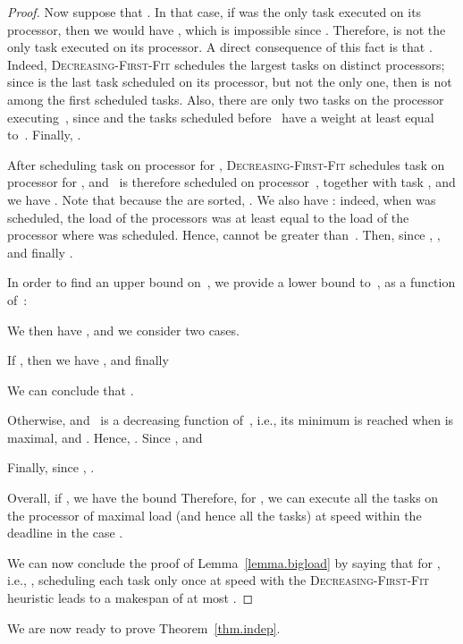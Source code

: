 \documentclass[a4paper]{article}
\theoremstyle{plain}
\theoremstyle{definition}
\theoremstyle{remark}
\newcommand{\dff}{\textsc{Dec\-reasing-First-Fit}\xspace}
\begin{document}
\begin{proof}
Now suppose that . In that case, if  was the
only task executed on its processor, then we would have
, which is impossible
since .  Therefore, 
is not the only task executed on its processor.  A direct consequence
of this fact is that . Indeed, \dff schedules the 
largest tasks on  distinct processors; since  is the last
task scheduled on its processor, but not the only one, then  is
not among the  first scheduled tasks. Also, there are only two
tasks on the processor executing~, since 
and the tasks scheduled before~ have a weight at least equal
to~. Finally, . 

After scheduling task  on processor  for ,
\dff schedules task  on processor  for , and ~is therefore scheduled on processor~,
together with task , and we have   
.
Note that because the  are sorted, . 
We also have : indeed, when  was
scheduled, the load of the  processors was at least equal to the
load of the processor where  was scheduled. Hence, 
 cannot be greater than~.  Then, since
,  , and finally . 

In order to find an upper bound on~, we provide a
lower bound to~, as a function of~: 


We then have , and we consider two cases. 


If , 
then we have , and finally 

We can conclude that . 


Otherwise,  and ~is a decreasing function of~,
i.e., its minimum is reached when  is maximal, and .
 Hence, . 
Since ,  and 

Finally, since , . 






Overall, if , we have the
bound  Therefore, for , we can
execute all the tasks on the processor of maximal load (and hence all
the tasks) at speed  within the deadline
 in the case . 

\medskip We can now conclude the proof of
Lemma~\ref{lemma.bigload} by saying that for , i.e., , scheduling each task only once at speed  with
 the \dff heuristic leads to a make\-span of at most .
 \end{proof}





We are now ready to prove Theorem~\ref{thm.indep}. 
\end{document}
